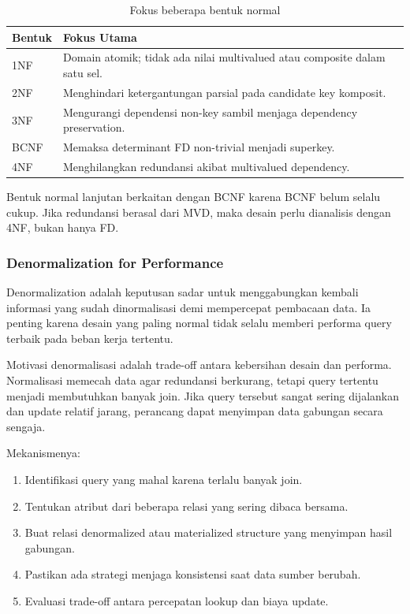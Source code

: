\begin{table}[H]
\centering
\begin{tabularx}{\textwidth}{|L{0.18\textwidth}|X|}
\hline
\textbf{Bentuk} & \textbf{Fokus Utama} \\
\hline
1NF & Domain atomik; tidak ada nilai multivalued atau composite dalam satu sel. \\
\hline
2NF & Menghindari ketergantungan parsial pada candidate key komposit. \\
\hline
3NF & Mengurangi dependensi non-key sambil menjaga dependency preservation. \\
\hline
BCNF & Memaksa determinant FD non-trivial menjadi superkey. \\
\hline
4NF & Menghilangkan redundansi akibat multivalued dependency. \\
\hline
\end{tabularx}
\caption{Fokus beberapa bentuk normal}
\label{tab:normal-forms}
\end{table}

Bentuk normal lanjutan berkaitan dengan BCNF karena BCNF belum selalu cukup. Jika redundansi berasal dari MVD, maka desain perlu dianalisis dengan 4NF, bukan hanya FD.

\subsubsection{Denormalization for Performance}

\begin{jawab}
Denormalization adalah keputusan sadar untuk menggabungkan kembali informasi yang sudah dinormalisasi demi mempercepat pembacaan data. Ia penting karena desain yang paling normal tidak selalu memberi performa query terbaik pada beban kerja tertentu.
\end{jawab}

Motivasi denormalisasi adalah trade-off antara kebersihan desain dan performa. Normalisasi memecah data agar redundansi berkurang, tetapi query tertentu menjadi membutuhkan banyak join. Jika query tersebut sangat sering dijalankan dan update relatif jarang, perancang dapat menyimpan data gabungan secara sengaja.

Mekanismenya:
\begin{enumerate}
    \item Identifikasi query yang mahal karena terlalu banyak join.
    \item Tentukan atribut dari beberapa relasi yang sering dibaca bersama.
    \item Buat relasi denormalized atau materialized structure yang menyimpan hasil gabungan.
    \item Pastikan ada strategi menjaga konsistensi saat data sumber berubah.
    \item Evaluasi trade-off antara percepatan lookup dan biaya update.
\end{enumerate}

